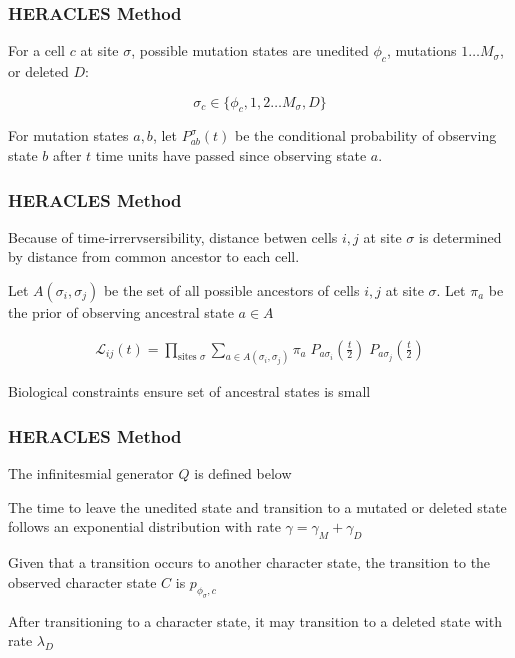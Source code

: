 \documentclass[
	11pt, %
]{beamer}
\begin{document}

\begin{frame}
	\frametitle{HERACLES Method}

	For a cell $c$ at site $\sigma$, possible mutation states are unedited $\phi_c$, mutations $1 \ldots M_\sigma$, or deleted $D$:

	\begin{equation*}
		\sigma_c \in \{\phi_c, 1, 2 \ldots M_\sigma, D \}
	\end{equation*}

	For mutation states $a,b$, let $P_{ab}^\sigma (t)$ be the conditional probability of observing state $b$ after $t$ time units have passed since observing state $a$.
\end{frame}


\begin{frame}
	\frametitle{HERACLES Method}
	Because of time-irrervsersibility, distance betwen cells $i,j$ at site $\sigma$ is determined by distance from common ancestor to each cell.
	\bigskip

	Let $A(\sigma_i, \sigma_j)$ be the set of all possible ancestors of cells $i,j$ at site $\sigma$. Let $\pi_a$ be the prior of observing ancestral state $a \in A$

	\begin{align*}
		\mathcal{L}_{ij}(t) = \prod_{\textrm{sites } \sigma} \sum_{a \in A(\sigma_i, \sigma_j)} \pi_a \; P_{a \sigma_i}(\frac{t}{2}) \; P_{a \sigma_j}(\frac{t}{2})
	\end{align*}

	Biological constraints ensure set of ancestral states is small
\end{frame}


\begin{frame}
	\frametitle{HERACLES Method}

	The infinitesmial generator  $Q$ is defined below
	\bigskip
	
	The time to leave the unedited state and transition to a mutated or deleted state follows an exponential distribution with rate $\gamma = \gamma_M + \gamma_D$
	\bigskip
	
	Given that a transition occurs to another character state, the transition to the observed character state $C$ is $p_{\phi_\sigma, c}$
	\bigskip

	After transitioning to a character state, it may transition to a deleted state with rate $\lambda_D$
\end{frame}
\end{document}
